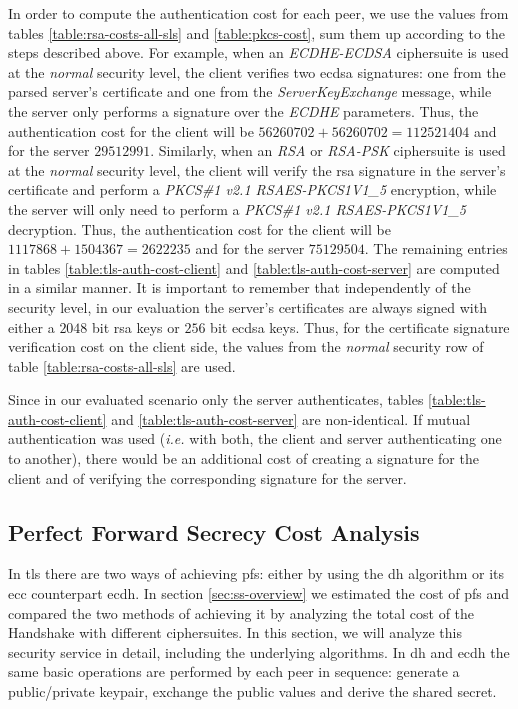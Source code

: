 In order to compute the authentication cost for each peer, we use the values from tables \ref{table:rsa-costs-all-sls} and \ref{table:pkcs-cost},
sum them up according to the steps described above. For example, when an \textit{ECDHE-ECDSA} ciphersuite is used at the \textit{normal} security level,
the client verifies two \gls{ecdsa} signatures: one from the parsed server's certificate
and one from the \textit{ServerKeyExchange} message, while the server only performs a signature over the \textit{ECDHE} parameters.
Thus, the authentication cost for the client will be $56260702+56260702=112521404$ and for the server $29512991$. Similarly, when an \textit{RSA} or
\textit{RSA-PSK} ciphersuite is used at the \textit{normal} security level, the client will verify the \gls{rsa} signature in the server's certificate
and perform a \textit{PKCS\#1 v2.1 RSAES-PKCS1\-V1\_5} encryption, while the server will only need to perform a
\textit{PKCS\#1 v2.1 RSAES-PKCS1\-V1\_5} decryption. Thus, the authentication cost for the client will be $1117868+1504367=2622235$ and for the server
$75129504$. The remaining entries in tables \ref{table:tls-auth-cost-client} and \ref{table:tls-auth-cost-server} are computed in a similar manner.
It is important to remember that independently of the security level, in our evaluation the server's certificates are always signed with either a 
$2048$ bit \gls{rsa} keys or $256$ bit \gls{ecdsa} keys. Thus, for the certificate signature verification cost on the client side, 
the values from the \textit{normal} security row of table \ref{table:rsa-costs-all-sls} are used.

Since in our evaluated scenario only the server authenticates, tables \ref{table:tls-auth-cost-client} and \ref{table:tls-auth-cost-server}
are non-identical. If mutual authentication was used (\textit{i.e.} with both, the client and server authenticating one to another), there would be
an additional cost of creating a signature for the client and of verifying the corresponding signature for the server.

\subsection{Perfect Forward Secrecy Cost Analysis} \label{sec:pfs-costs}

In \gls{tls} there are two ways of achieving \gls{pfs}: either by using the \gls{dh} algorithm or its \gls{ecc} counterpart \gls{ecdh}.
In section \ref{sec:ss-overview} we estimated the cost of \gls{pfs} and compared the two methods of achieving it by analyzing the total cost of the
Handshake with different ciphersuites. In this section, we will analyze this security service in detail, including the underlying algorithms.
In \gls{dh} and \gls{ecdh} the same basic operations are performed by each peer in sequence: generate a public/private keypair, exchange the public values
and derive the shared secret.

